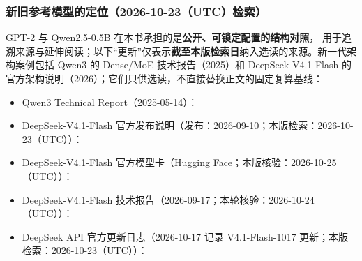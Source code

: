 \subsubsection*{新旧参考模型的定位（2026-10-23（UTC）检索）}
GPT-2 与 Qwen2.5-0.5B 在本书承担的是\textbf{公开、可锁定配置的结构对照}，
用于追溯来源与延伸阅读；以下“更新”仅表示\textbf{截至本版检索日}纳入选读的来源。新一代架构案例包括
Qwen3 的 Dense/MoE 技术报告（2025）和 DeepSeek-V4.1-Flash
的官方架构说明（2026）；它们只供选读，不直接替换正文的固定复算基线：
\begin{itemize}
\item Qwen3 Technical Report（2025-05-14）：
\item DeepSeek-V4.1-Flash 官方发布说明（发布：2026-09-10；本版检索：2026-10-23（UTC））：
\item DeepSeek-V4.1-Flash 官方模型卡（Hugging Face；本版核验：2026-10-25（UTC））：
\item DeepSeek-V4.1-Flash 技术报告（2026-09-17；本轮核验：2026-10-24（UTC））：
\item DeepSeek API 官方更新日志（2026-10-17 记录 V4.1-Flash-1017 更新；本版检索：2026-10-23（UTC））：
\end{itemize}

\par\medskip

